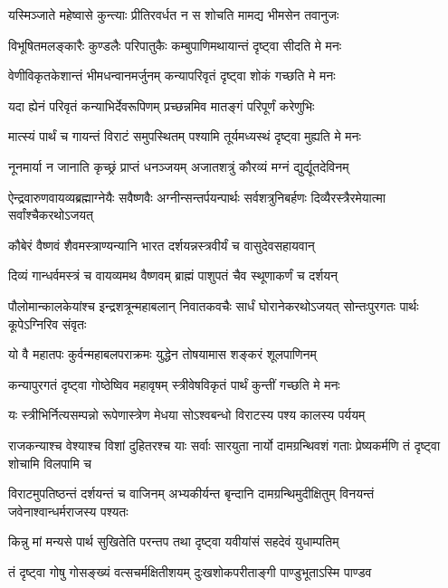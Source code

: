 \twolineshloka
{यस्मिञ्जाते महेष्वासे कुन्त्याः प्रीतिरवर्धत}
{न स शोचति मामद्य भीमसेन तवानुजः}


\twolineshloka
{विभूषितमलङ्कारैः कुण्डलैः परिपातुकैः}
{कम्बुपाणिमथायान्तं दृष्ट्वा सीदति मे मनः}


\twolineshloka
{वेणीविकृतकेशान्तं भीमधन्वानमर्जुनम्}
{कन्यापरिवृतं दृष्ट्वा शोकं गच्छति मे मनः}


\twolineshloka
{यदा ह्येनं परिवृतं कन्याभिर्देवरूपिणम्}
{प्रच्छन्नमिव मातङ्गं परिपूर्णं करेणुभिः}


\twolineshloka
{मात्स्यं पार्थं च गायन्तं विराटं समुपस्थितम्}
{पश्यामि तूर्यमध्यस्थं दृष्ट्वा मुह्यति मे मनः}


\twolineshloka
{नूनमार्या न जानाति कृच्छ्रं प्राप्तं धनञ्जयम्}
{अजातशत्रुं कौरव्यं मग्नं द्युर्द्यूतदेविनम्}


\threelineshloka
{ऐन्द्रवारुणवायव्यब्रह्माग्नेयैः सवैष्णवैः}
{अग्नीन्सन्तर्पयन्पार्थः सर्वशत्रुनिबर्हणः}
{दिव्यैरस्त्रैरमेयात्मा सर्वांश्चैकरथोऽजयत्}


\twolineshloka
{कौबेरं वैष्णवं शैवमस्त्राण्यन्यानि भारत}
{दर्शयन्नस्त्रवीर्यं च वासुदेवसहायवान्}


\twolineshloka
{दिव्यं गान्धर्वमस्त्रं च वायव्यमथ वैष्णवम्}
{ब्राह्मं पाशुपतं चैव स्थूणाकर्णं च दर्शयन्}


\threelineshloka
{पौलोमान्कालकेयांश्च इन्द्रशत्रून्महाबलान्}
{निवातकवचैः सार्धं घोरानेकरथोऽजयत्}
{सोन्तःपुरगतः पार्थः कूपेऽग्निरिव संवृतः}


\twolineshloka
{यो वै महातपः कुर्वन्महाबलपराक्रमः}
{युद्धेन तोषयामास शङ्करं शूलपाणिनम्}


\twolineshloka
{कन्यापुरगतं दृष्ट्वा गोष्ठेष्विव महावृषम्}
{स्त्रीवेषविकृतं पार्थं कुन्तीं गच्छति मे मनः}


\twolineshloka
{यः स्त्रीभिर्नित्यसम्पन्नो रूपेणास्त्रेण मेधया}
{सोऽश्वबन्धो विराटस्य पश्य कालस्य पर्ययम्}


\threelineshloka
{राजकन्याश्च वेश्याश्च विशां दुहितरश्च याः}
{सर्वाः सारयुता नार्यो दामग्रन्थिवशं गताः}
{प्रेष्यकर्मणि तं दृष्ट्वा शोचामि विलपामि च}


\threelineshloka
{विराटमुपतिष्ठन्तं दर्शयन्तं च वाजिनम्}
{अभ्यकीर्यन्त बृन्दानि दामग्रन्थिमुदीक्षितुम्}
{विनयन्तं जवेनाश्वान्धर्मराजस्य पश्यतः}


\twolineshloka
{किन्नु मां मन्यसे पार्थ सुखितेति परन्तप}
{तथा दृष्ट्वा यवीयांसं सहदेवं युधाम्पतिम्}


\twolineshloka
{तं दृष्ट्वा गोषु गोसङ्ख्यं वत्सचर्मक्षितीशयम्}
{दुःखशोकपरीताङ्गी पाण्डुभूताऽस्मि पाण्डव}


